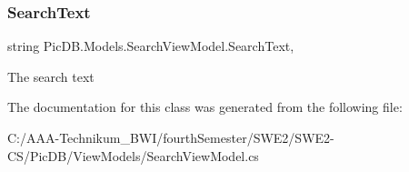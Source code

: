 \subsubsection{\texorpdfstring{Search\+Text}{SearchText}}
{\footnotesize\ttfamily string Pic\+D\+B.\+Models.\+Search\+View\+Model.\+Search\+Text\hspace{0.3cm}{\ttfamily [get]}, {\ttfamily [set]}}



The search text 



The documentation for this class was generated from the following file\+:\begin{DoxyCompactItemize}
\item 
C\+:/\+A\+A\+A-\/\+Technikum\+\_\+\+B\+W\+I/fourth\+Semester/\+S\+W\+E2/\+S\+W\+E2-\/\+C\+S/\+Pic\+D\+B/\+View\+Models/Search\+View\+Model.\+cs\end{DoxyCompactItemize}

